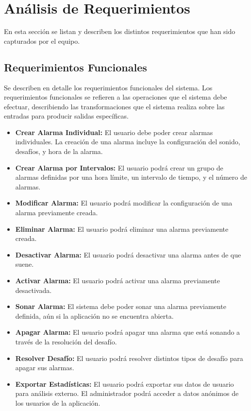 \section{Análisis de Requerimientos}
En esta sección se listan y describen los distintos requerimientos que han sido capturados por el equipo.
\subsection{Requerimientos Funcionales}
Se describen en detalle los requerimientos funcionales del sistema. Los requerimientos funcionales se refieren a las operaciones que el sistema debe efectuar, describiendo las transformaciones que el sistema realiza sobre las entradas para producir salidas específicas.

\begin{itemize}
    \item \textbf{Crear Alarma Individual:} El usuario debe poder crear alarmas individuales. La creación de una alarma incluye la configuración del sonido, desafíos, y hora de la alarma.
    \item \textbf{Crear Alarma por Intervalos:} El usuario podrá crear un grupo de alarmas definidas por una hora límite, un intervalo de tiempo, y el número de alarmas.
    \item \textbf{Modificar Alarma:} El usuario podrá modificar la configuración de una alarma previamente creada.
    \item \textbf{Eliminar Alarma:} El usuario podrá eliminar una alarma previamente creada.
    \item \textbf{Desactivar Alarma:} El usuario podrá desactivar una alarma antes de que suene.
    \item \textbf{Activar Alarma:} El usuario podrá activar una alarma previamente desactivada.
    \item \textbf{Sonar Alarma:} El sistema debe poder sonar una alarma previamente definida, aún si la aplicación no se encuentra abierta.
    \item \textbf{Apagar Alarma:} El usuario podrá apagar una alarma que está sonando a través de la resolución del desafío.
    \item \textbf{Resolver Desafío:} El usuario podrá resolver distintos tipos de desafío para apagar sus alarmas.
    \item \textbf{Exportar Estadísticas:} El usuario podrá exportar sus datos de usuario para análisis externo. El administrador podrá acceder a datos anónimos de los usuarios de la aplicación.
\end{itemize}
